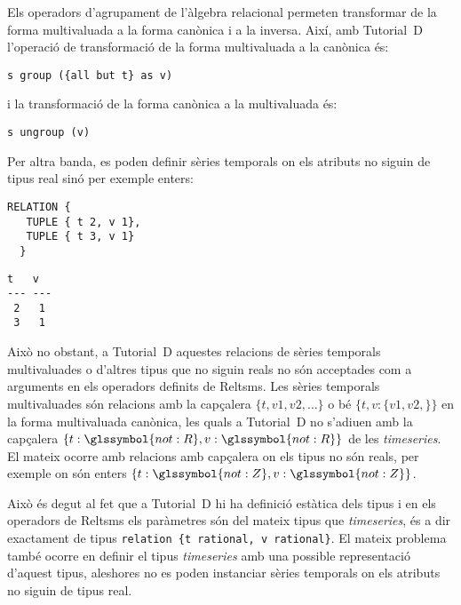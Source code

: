 {Els operadors d'agrupament de l'àlgebra relacional permeten
transformar de la forma multivaluada a la forma canònica i a la
inversa. Així, amb Tutorial~D l'operació de transformació de la forma
multivaluada a la canònica és:
\begin{lstlisting}[style=tutorialD]
s group ({all but t} as v)
\end{lstlisting}
i la transformació de la forma canònica a la multivaluada és:
\begin{lstlisting}[style=tutorialD]
s ungroup (v)
\end{lstlisting}










Per altra banda, es poden definir sèries temporals on els atributs no
siguin de tipus real sinó per exemple enters:
\begin{lstlisting}[style=tutorialD]
 RELATION {
   TUPLE { t 2, v 1},
   TUPLE { t 3, v 1}
  }
\end{lstlisting}
\begin{lstlisting}[style=stdout]
 t   v 
--- ---
 2   1
 3   1
\end{lstlisting}





Això no obstant, a Tutorial~D aquestes relacions de sèries temporals
multivaluades o d'altres tipus que no siguin reals no són acceptades
com a arguments en els operadors definits de Reltsms.  Les sèries
temporals multivaluades són relacions amb la capçalera $\{t, v1, v2,
\ldots \}$ o bé $\{t, v: \{v1, v2,\} \}$ en la forma multivaluada
canònica, les quals a Tutorial~D no s'adiuen amb la capçalera
$\{t:\glssymbol{not:R}, v:\glssymbol{not:R}\}$ de les
\emph{timeseries}. El mateix ocorre amb relacions amb capçalera on
els tipus no són reals, per exemple on són enters
$\{t:\glssymbol{not:Z}, v:\glssymbol{not:Z}\}$.

Això és degut al fet que a Tutorial~D hi ha definició estàtica dels
tipus i en els operadors de Reltsms els paràmetres són del mateix
tipus que \emph{timeseries}, és a dir exactament de tipus
\lstinline[style=tutorialD]+relation {t rational, v rational}+.  El
mateix problema també ocorre en definir el tipus \emph{timeseries} amb
una possible representació d'aquest tipus, aleshores no es poden
instanciar sèries temporals on els atributs no siguin de tipus real.


}
